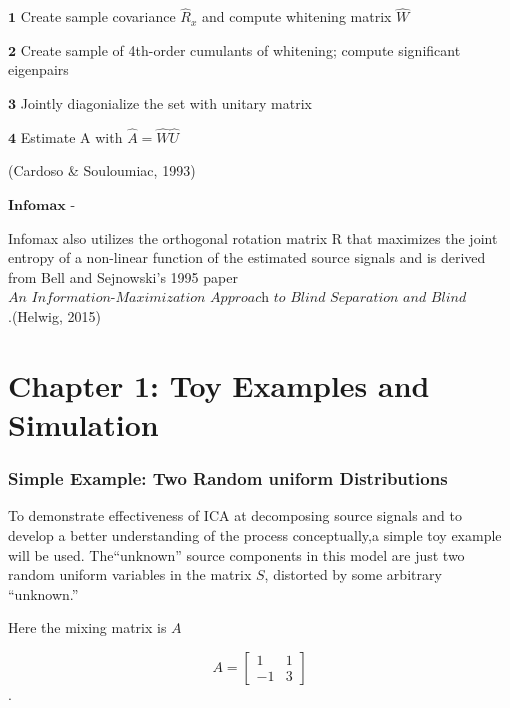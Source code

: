 \documentclass[12pt,twoside]{amherstthesis}
\begin{document}
  \(\textbf{1}\) Create sample covariance \(\hat{R}_x\) and compute
  whitening matrix \(\hat{W}\) \newline
  
  \(\textbf{2}\) Create sample of 4th-order cumulants of whitening;
  compute significant eigenpairs \newline
  
  \(\textbf{3}\) Jointly diagonialize the set with unitary matrix \newline
  
  \(\textbf{4}\) Estimate A with \(\hat{A} =\hat{W}\hat{U}\) \newline
  
  (Cardoso \& Souloumiac, 1993) \newline
  
  \(\textbf{Infomax}\) - \newline
  
  Infomax also utilizes the orthogonal rotation matrix R that maximizes
  the joint entropy of a non-linear function of the estimated source
  signals and is derived from Bell and Sejnowski's 1995 paper
  \(\textit{An Information-Maximization Approach to Blind Separation and Blind Deconvolution}\).(Helwig,
  2015)
  
  \chapter{Chapter 1: Toy Examples and
  Simulation}\label{chapter-1-toy-examples-and-simulation}
  
  \subsection{Simple Example: Two Random uniform
  Distributions}\label{simple-example-two-random-uniform-distributions}
  
  To demonstrate effectiveness of ICA at decomposing source signals and to
  develop a better understanding of the process conceptually,a simple toy
  example will be used. The``unknown'' source components in this model are
  just two random uniform variables in the matrix \(S\), distorted by some
  arbitrary ``unknown.'' \newline
  
  Here the mixing matrix is \(A\)
  
  \[A = \begin{bmatrix} 1 & 1 \\ -1 & 3  \end{bmatrix}\] .
  
\end{document}
